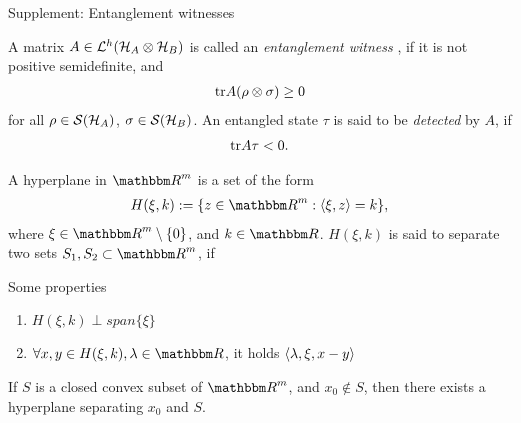      \begin{section}{Supplement: Entanglement witnesses}
      \begin{definition}
      A matrix $A \in {\mathcal L}^h({\mathcal H}_A \otimes {\mathcal H}_B)$ is called an \emph{entanglement witness} , if it is not positive semidefinite, and 
      \begin{align}
       \mathrm{tr} A(\rho \otimes \sigma) \geq 0 
      \end{align}
      for all $\rho \in {\mathcal S}({\mathcal H}_A)$, $\sigma \in {\mathcal S}({\mathcal H}_B)$. An entangled state $\tau$ is said to be \emph{detected} by $A$, if 
      \begin{align}
       \mathrm{tr} A \tau < 0.
      \end{align}
     \end{definition}

     \begin{definition}
      A hyperplane in $\bbmR^m$ is a set of the form
      \begin{align}
       H(\xi, k) := \{z \in \bbmR^m: \braket{\xi,z} = k\},
      \end{align}
      where $\xi \in \bbmR^m \setminus \{0\}$, and $k \in \bbmR$. $H(\xi,k)$ is said to separate two sets $S_1, S_2 \subset \bbmR^m$, if 
     \end{definition}
     Some properties 
     \begin{enumerate}
      \item $H(\xi,k) \perp span \{\xi\}$
      \item $\forall x,y \in H(\xi,k) ,\lambda \in \bbmR$, it holds $\braket{\lambda, \xi, x -y}$
     \end{enumerate}
     
     
     \begin{theorem} \label{thm:separating_hyperplanes}
     If $S$ is a closed convex subset of $\bbmR^m$, and $x_0 \notin S$, then there exists a hyperplane separating $x_0$ and $S$.
     \end{theorem}
  

\end{section}
